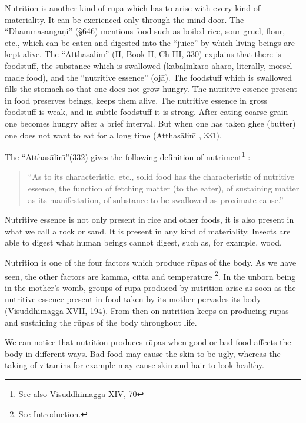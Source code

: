 \documentclass{book}
\begin{document}
Nutrition is another kind of r\=upa which has to arise with every kind
of materiality. It can be exerienced only through the mind-door. The
``Dhamma\-sanga\d ni'' ({\S}646) mentions food such as boiled rice, sour
gruel, flour, etc., which can be eaten and digested into the ``juice''
by which living beings are kept alive. The ``Atthas{\=a}lin\=\i'' (II,
Book II, Ch III, 330) explains that there is foodstuff, the substance
which is swallowed (kaba\d link{\=a}ro {\=a}h{\=a}ro, literally,
morsel-made food), and the ``nutritive essence'' (oj{\=a}). The
foodstuff which is swallowed fills the stomach so that one does not
grow hungry. The nutritive essence present in food preserves beings,
keeps them alive. The nutritive essence in gross foodstuff is weak, and
in subtle foodstuff it is strong. After eating coarse grain one becomes
hungry after a brief interval. But when one has taken ghee (butter) one
does not want to eat for a long time (Atthas{\=a}lin\=\i{} , 331).

The ``Atthas{\=a}lin\=\i''(332) gives the following definition of
nutriment\footnote{See also Visuddhimagga XIV, 70} : 




\begin{quote}\begin{flushleft}
``As to its characteristic, etc., solid food has the characteristic of
nutritive essence, the function of fetching matter (to the eater), of
sustaining matter as its manifestation, of substance to be swallowed as
proximate cause.''

\end{flushleft}\end{quote}



Nutritive essence is not only present in rice and other foods, it is
also present in what we call a rock or sand. It is present in any kind
of materiality. Insects are able to digest what human beings cannot
digest, such as, for example, wood.

Nutrition is one of the four factors which produce r\=upas of the body.
As we have seen, the other factors are kamma, citta and temperature
\footnote{See Introduction.}. In the unborn being in the mother's
womb, groups of r\=upa produced by nutrition arise as soon as the
nutritive essence present in food taken by its mother pervades its body
(Visuddhimagga XVII, 194). From then on nutrition keeps on producing
r\=upas and sustaining the r\=upas of the body throughout life. 

We can notice that nutrition produces r\=upas when good or bad food
affects the body in different ways. Bad food may cause the skin to be
ugly, whereas the taking of vitamins for example may cause skin and
hair to look healthy.
\end{document}
